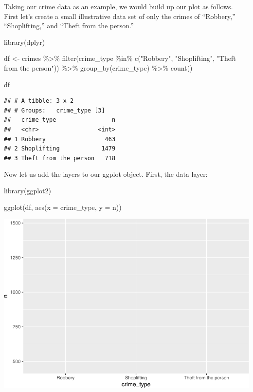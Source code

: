\documentclass[
  krantz2]{krantz}
\makeatletter
\newenvironment{Shaded}{\begin{snugshade}}{\end{snugshade}}
\newcommand{\AttributeTok}[1]{\textcolor[rgb]{0.61,0.61,0.61}{#1}}
\newcommand{\FunctionTok}[1]{\textcolor[rgb]{0,0,0}{#1}}
\newcommand{\NormalTok}[1]{#1}
\newcommand{\OtherTok}[1]{\textcolor[rgb]{0.37,0.37,0.37}{#1}}
\newcommand{\SpecialCharTok}[1]{\textcolor[rgb]{0,0,0}{#1}}
\newcommand{\StringTok}[1]{\textcolor[rgb]{0.5,0.5,0.5}{#1}}
\newenvironment{kframe}{%
\medskip{}
\setlength{\fboxsep}{.8em}
 \def\at@end@of@kframe{}%
 \ifinner\ifhmode%
  \def\at@end@of@kframe{\end{minipage}}%
  \begin{minipage}{\columnwidth}%
 \fi\fi%
 \def\FrameCommand##1{\hskip\@totalleftmargin \hskip-\fboxsep
 \colorbox{shadecolor}{##1}\hskip-\fboxsep
     \hskip-\linewidth \hskip-\@totalleftmargin \hskip\columnwidth}%
 \MakeFramed {\advance\hsize-\width
   \@totalleftmargin\z@ \linewidth\hsize
   \@setminipage}}%
 {\par\unskip\endMakeFramed%
 \at@end@of@kframe}
\renewenvironment{Shaded}{\begin{kframe}}{\end{kframe}}
\makeatother
\begin{document}
Taking our crime data as an example, we would build up our plot as follows. First let's create a small illustrative data set of only the crimes of ``Robbery,'' ``Shoplifting,'' and ``Theft from the person.''

\begin{Shaded}
\begin{Highlighting}[]
\FunctionTok{library}\NormalTok{(dplyr)}

\NormalTok{df }\OtherTok{\textless{}{-}}\NormalTok{ crimes }\SpecialCharTok{\%\textgreater{}\%} 
  \FunctionTok{filter}\NormalTok{(crime\_type }\SpecialCharTok{\%in\%} \FunctionTok{c}\NormalTok{(}\StringTok{"Robbery"}\NormalTok{, }
                           \StringTok{"Shoplifting"}\NormalTok{, }
                           \StringTok{"Theft from the person"}\NormalTok{)) }\SpecialCharTok{\%\textgreater{}\%} 
  \FunctionTok{group\_by}\NormalTok{(crime\_type) }\SpecialCharTok{\%\textgreater{}\%} 
  \FunctionTok{count}\NormalTok{() }
  
\NormalTok{df}
\end{Highlighting}
\end{Shaded}

\begin{verbatim}
## # A tibble: 3 x 2
## # Groups:   crime_type [3]
##   crime_type                n
##   <chr>                 <int>
## 1 Robbery                 463
## 2 Shoplifting            1479
## 3 Theft from the person   718
\end{verbatim}

Now let us add the layers to our ggplot object. First, the data layer:

\begin{Shaded}
\begin{Highlighting}[]
\FunctionTok{library}\NormalTok{(ggplot2)}

\FunctionTok{ggplot}\NormalTok{(df, }\FunctionTok{aes}\NormalTok{(}\AttributeTok{x =}\NormalTok{ crime\_type, }\AttributeTok{y =}\NormalTok{ n))}
\end{Highlighting}
\end{Shaded}

\includegraphics{crime_mapping_files/figure-latex/unnamed-chunk-8-1.pdf}
\end{document}

